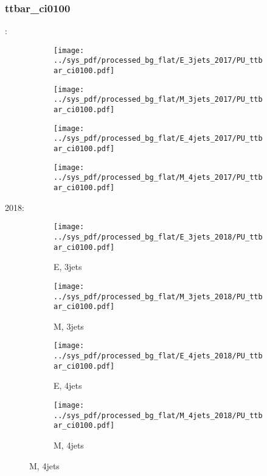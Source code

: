 \documentclass{beamer}
\begin{document}
\begin{frame}
\frametitle{ttbar_ci0100}
\fontsize{5}{1}:
\begin{figure}
\centering
\begin{subfigure}[b]{0.24\textwidth}
\texttt{[image: ../sys\_pdf/processed\_bg\_flat/E\_3jets\_2017/PU\_ttbar\_ci0100.pdf]}
\end{subfigure}
\begin{subfigure}[b]{0.24\textwidth}
\texttt{[image: ../sys\_pdf/processed\_bg\_flat/M\_3jets\_2017/PU\_ttbar\_ci0100.pdf]}
\end{subfigure}
\begin{subfigure}[b]{0.24\textwidth}
\texttt{[image: ../sys\_pdf/processed\_bg\_flat/E\_4jets\_2017/PU\_ttbar\_ci0100.pdf]}
\end{subfigure}
\begin{subfigure}[b]{0.24\textwidth}
\texttt{[image: ../sys\_pdf/processed\_bg\_flat/M\_4jets\_2017/PU\_ttbar\_ci0100.pdf]}
\end{subfigure}
\end{figure}
2018:
\begin{figure}
\centering
\begin{subfigure}[b]{0.24\textwidth}
\texttt{[image: ../sys\_pdf/processed\_bg\_flat/E\_3jets\_2018/PU\_ttbar\_ci0100.pdf]}
\captionsetup{font=tiny}
\caption{E, 3jets}
\end{subfigure}
\begin{subfigure}[b]{0.24\textwidth}
\texttt{[image: ../sys\_pdf/processed\_bg\_flat/M\_3jets\_2018/PU\_ttbar\_ci0100.pdf]}
\captionsetup{font=tiny}
\caption{M, 3jets}
\end{subfigure}
\begin{subfigure}[b]{0.24\textwidth}
\texttt{[image: ../sys\_pdf/processed\_bg\_flat/E\_4jets\_2018/PU\_ttbar\_ci0100.pdf]}
\captionsetup{font=tiny}
\caption{E, 4jets}
\end{subfigure}
\begin{subfigure}[b]{0.24\textwidth}
\texttt{[image: ../sys\_pdf/processed\_bg\_flat/M\_4jets\_2018/PU\_ttbar\_ci0100.pdf]}
\captionsetup{font=tiny}
\caption{M, 4jets}
\end{subfigure}
\end{figure}
\end{frame}
\end{document}
